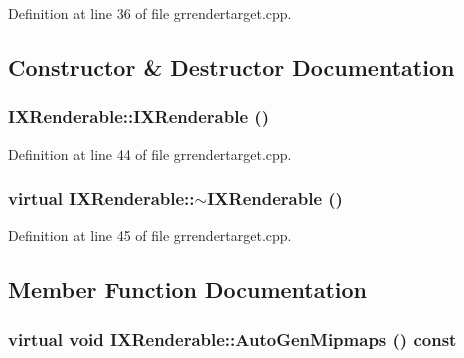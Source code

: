 \begin{CompactItemize}
Definition at line 36 of file grrendertarget.cpp.

\subsection{Constructor \& Destructor Documentation}
\hypertarget{class_i_x_renderable_3b6b8d3b41c8ad45864922a1dedd3d04}{
\subsubsection[{IXRenderable}]{\setlength{\rightskip}{0pt plus 5cm}IXRenderable::IXRenderable ()}}
\label{class_i_x_renderable_3b6b8d3b41c8ad45864922a1dedd3d04}




Definition at line 44 of file grrendertarget.cpp.\hypertarget{class_i_x_renderable_83506efaeb52b2170bf0c643edcb56aa}{
\subsubsection[{$\sim$IXRenderable}]{\setlength{\rightskip}{0pt plus 5cm}virtual IXRenderable::$\sim$IXRenderable ()}}
\label{class_i_x_renderable_83506efaeb52b2170bf0c643edcb56aa}




Definition at line 45 of file grrendertarget.cpp.

\subsection{Member Function Documentation}
\hypertarget{class_i_x_renderable_4e47253020e9f0faabb51b37ee5e16ae}{
\subsubsection[{AutoGenMipmaps}]{\setlength{\rightskip}{0pt plus 5cm}virtual void IXRenderable::AutoGenMipmaps () const}}
\label{class_i_x_renderable_4e47253020e9f0faabb51b37ee5e16ae}





\end{CompactItemize}

